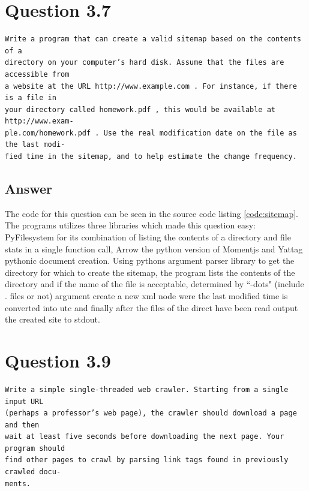 \documentclass[a4paper,11pt]{article}
\newenvironment{code}{\captionsetup{type=listing}}{}
\begin{document}
\section{Question 3.7}
\begin{verbatim}
Write a program that can create a valid sitemap based on the contents of a
directory on your computer’s hard disk. Assume that the files are accessible from
a website at the URL http://www.example.com . For instance, if there is a file in
your directory called homework.pdf , this would be available at http://www.exam-
ple.com/homework.pdf . Use the real modification date on the file as the last modi-
fied time in the sitemap, and to help estimate the change frequency.
\end{verbatim}
\subsection{Answer}
\setcounter{listing}{0}
The code for this question can be seen in the source code listing \hyperref[code:sitemap]{\ref{code:sitemap}}. The programs utilizes three libraries which made this question easy: PyFilesystem \cite{pyfs} for its combination of listing the contents of a directory and file stats in a single function call, Arrow \cite{arrow} the python version of Momentjs and Yattag\cite{yattag} pythonic document creation. Using pythons argument parser library to get the directory for which to create the sitemap, the program lists the contents of the directory and if the name of the file is acceptable, determined by ``-dots" (include . files or not) argument create a new xml node were the last modified time is converted into utc and finally after the files of the direct have been read output the created site to stdout. 

\begin{code}
\label{code:sitemap}
\end{code}
\newpage
\clearpage
\section{Question 3.9}
\begin{verbatim}
Write a simple single-threaded web crawler. Starting from a single input URL
(perhaps a professor’s web page), the crawler should download a page and then
wait at least five seconds before downloading the next page. Your program should
find other pages to crawl by parsing link tags found in previously crawled docu-
ments.
\end{verbatim}
\end{document}
